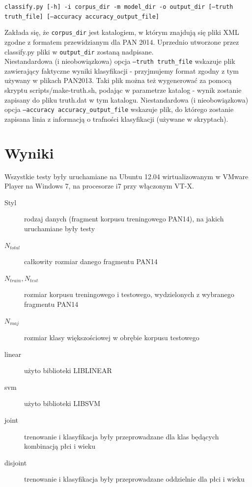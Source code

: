 \documentclass{article}
\begin{document}
\texttt{classify.py [-h] -i corpus\_dir -m model\_dir -o output\_dir  [--truth truth\_file] [--accuracy accuracy\_output\_file]}

Zakłada się, że \texttt{corpus\_dir} jest katalogiem, w którym znajdują się pliki XML zgodne z formatem przewidzianym dla PAN 2014. Uprzednio utworzone przez classify.py pliki w \texttt{output\_dir} zostaną nadpisane. \\
Niestandardowa (i nieobowiązkowa) opcja \texttt{--truth truth\_file} wskazuje plik zawierający faktyczne wyniki klasyfikacji - przyjmujemy format zgodny z tym używany w plikach PAN2013. Taki plik można też wygenerować za pomocą skryptu scripts/make-truth.sh, podając w parametrze katalog - wynik zostanie zapisany do pliku truth.dat w tym katalogu.
Niestandardowa (i nieobowiązkowa) opcja \texttt{--accuracy accuracy\_output\_file} wskazuje plik, do którego zostanie zapisana linia z informacją o trafności klasyfikacji (używane w skryptach).


\section{Wyniki}

Wszystkie testy były uruchamiane na Ubuntu 12.04 wirtualizowanym w VMware Player na Windows 7, na procesorze i7 przy włączonym VT-X. \\

\begin{description}

\item[Styl] rodzaj danych (fragment korpusu treningowego PAN14), na jakich uruchamiane były testy \\

\item[$N_{total}$] całkowity rozmiar danego fragmentu PAN14
\item[$N_{train}, N_{test}$] rozmiar korpusu treningowego i testowego, wydzielonych z wybranego fragmentu PAN14
\item[$N_{maj}$] rozmiar klasy większościowej w obrębie korpusu testowego \\

\item[linear] użyto biblioteki LIBLINEAR
\item[svm] użyto biblioteki LIBSVM
\item[joint] trenowanie i klasyfikacja były przeprowadzane dla klas będących kombinacją płci i wieku
\item[disjoint] trenowanie i klasyfikacja były przeprowadzane oddzielnie dla płci i wieku \\

\end{description}
\end{document}
